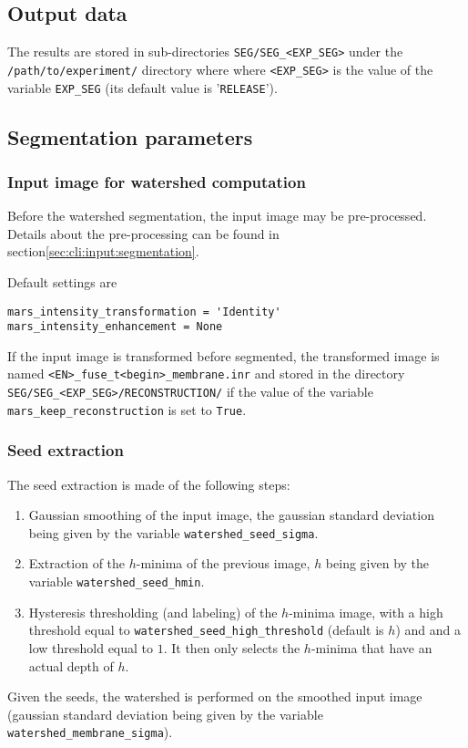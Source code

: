 \subsection{Output data}

The results are stored in sub-directories
\texttt{SEG/SEG\_<EXP\_SEG>} under the
\texttt{/path/to/experiment/} directory where where \texttt{<EXP\_SEG>} is the value of the variable \texttt{EXP\_SEG} (its
default value is '\texttt{RELEASE}'). 


\subsection{Segmentation parameters}


\subsubsection{Input image for watershed computation}
\label{sec:cli:mars:input:watershed}

Before the watershed segmentation, the input image may be pre-processed. Details about the pre-processing can be found in section\ref{sec:cli:input:segmentation}.

Default settings are
\begin{verbatim}
mars_intensity_transformation = 'Identity'
mars_intensity_enhancement = None
\end{verbatim}

If the input image is transformed before segmented, the transformed image is named \texttt{<EN>\_fuse\_t<begin>\_membrane.inr} and stored in the directory \texttt{SEG/SEG\_<EXP\_SEG>/RECONSTRUCTION/} if the value of the variable \texttt{mars\_keep\_reconstruction} is set to \texttt{True}.

\subsubsection{Seed extraction}
\label{sec:cli:mars:seed:extraction}

The seed extraction is made of the following steps:
\begin{enumerate}
\itemsep -0.5ex
\item Gaussian smoothing of the input image, the gaussian standard deviation being given by the variable \texttt{watershed\_seed\_sigma}.
\item Extraction of the $h$-minima of the previous image, $h$  being given by the variable \texttt{watershed\_seed\_hmin}.
\item Hysteresis thresholding (and labeling)  of the $h$-minima image, with a high threshold equal to \texttt{watershed\_seed\_high\_threshold} (default is $h$)  and and a low threshold equal to $1$. It then only selects the $h$-minima that have an actual depth of $h$.
\end{enumerate}
Given the seeds, the watershed is performed on the smoothed input image (gaussian standard deviation being given by the variable \texttt{watershed\_membrane\_sigma}).


